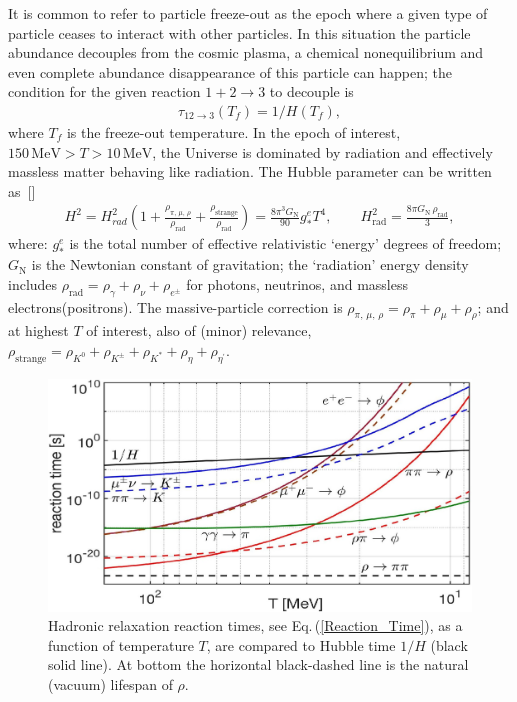 It is common to refer to particle freeze-out as the epoch where a given type of particle ceases to interact with other particles. In this situation the particle abundance decouples from the cosmic plasma, a chemical nonequilibrium and even complete abundance disappearance of this particle can happen; the condition for the given reaction $1+2\rightarrow 3$ to decouple is
\begin{align}
\tau_{12\rightarrow 3}(T_f)=1/H(T_f),
\end{align}
where $T_f$ is the freeze-out temperature.
In the epoch of interest, $150\,\mathrm{MeV}>T>10\,\mathrm{MeV}$, the Universe is dominated by radiation and effectively massless matter behaving like radiation. The Hubble parameter can be written as~[\cite{Kolb:1990vq}]
\begin{align}\label{H2g}
H^2=H^2_{rad}\left(1+\frac{\rho_{\pi,\,\mu,\,\rho}}{\rho_\mathrm{rad}}+\frac{\rho_\mathrm{strange}}{\rho_\mathrm{rad}}\right)=\frac{8\pi^3G_\mathrm{N}}{90}g^e_\ast T^4,\qquad H^2_\mathrm{rad}=\frac{8\pi G_\mathrm{N}\,\rho_\mathrm{rad}}{3},
\end{align}
where: $g^e_\ast$ is the total number of effective relativistic `energy' degrees of freedom; $G_\mathrm{N}$ is the Newtonian constant of gravitation; the `radiation' energy density includes $\rho_\mathrm{rad}=\rho_\gamma+\rho_\nu+\rho_{e^\pm}$ for photons, neutrinos, and massless electrons(positrons). The massive-particle correction is $\rho_{\pi,\,\mu,\,\rho}=\rho_\pi+\rho_\mu+\rho_\rho$; and at highest $T$ of interest, also of (minor) relevance, $\rho_\mathrm{strange}=\rho_{K^0}+\rho_{K^\pm}+\rho_{K^\ast}+\rho_{\eta}+\rho_{\eta^\prime}$.
\begin{figure}[ht]
\centering
\includegraphics[width=0.95\linewidth]{./plots/Strangeness_Hubble_C.jpg}
\caption{Hadronic relaxation reaction times, see Eq.\,(\ref{Reaction_Time}), as a function of temperature $T$, are compared to Hubble time $1/H$ (black solid line). At bottom the horizontal black-dashed line is the natural (vacuum) lifespan of $\rho$.}
\label{reaction_time_tot}
\end{figure}


